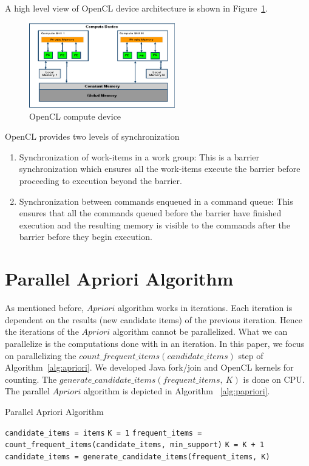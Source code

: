 \documentclass[conference]{IEEEtran}
\begin{document}
A high level view of OpenCL device architecture is shown in Figure~\ref{fig:computeDevice}.

\begin{figure}[!t]
\centering
\includegraphics[width=2.5in]{computedevice.eps}
\caption{OpenCL compute device}
\label{fig:computeDevice}
\end{figure}

OpenCL provides two levels of synchronization
\begin{enumerate}
\item{Synchronization of work-items in a work group: This is a barrier synchronization which ensures all the work-items execute the barrier before proceeding to execution beyond the barrier.}
\item{Synchronization between commands enqueued in a command queue: This ensures that all the commands queued before the barrier have finished execution and the resulting memory is visible to the commands after the barrier before they begin execution.}
\end{enumerate}

\section{Parallel Apriori Algorithm}
As mentioned before, $Apriori$ algorithm works in iterations. Each iteration is dependent on the results (new candidate items) of the previous iteration. Hence the iterations of the $Apriori$ algorithm cannot be parallelized. What we can parallelize is the computations done with in an iteration. In this paper, we focus on parallelizing the $count\_frequent\_items(candidate\_items)$ step of Algorithm~\ref{alg:apriori}. We developed Java fork/join and OpenCL kernels for counting. The $generate\_candidate\_items(frequent\_items,\ K)$ is done on CPU. The parallel $Apriori$ algorithm is depicted in Algorithm ~\ref{alg:papriori}. 

\begin{algorithm}\caption{Parallel Apriori Algorithm}\label{alg:papriori}
  \begin{algorithmic}[1]
	\STATE \texttt{candidate\_items = items}
	\STATE \texttt{K = 1}
	        \STATE \texttt{frequent\_items = count\_frequent\_items(candidate\_items, min\_support)}
			\ENDFOR		 
			\STATE \texttt{K = K + 1}
	    \STATE \texttt {candidate\_items = generate\_candidate\_items(frequent\_items, K)}
    \ENDWHILE
  \end{algorithmic}
\end{algorithm}
\end{document}
